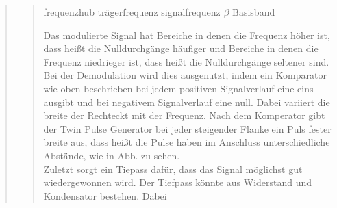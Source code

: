 \begin{quote}
\begin{quote}
        frequenzhub
        trägerfrequenz
        signalfrequenz
        $\beta$
        Basisband
        
        Das modulierte Signal hat Bereiche in denen die Frequenz höher ist, dass
        heißt die Nulldurchgänge häufiger und Bereiche in denen die Frequenz
        niedrieger ist, dass heißt die Nulldurchgänge seltener sind. Bei der
        Demodulation wird dies ausgenutzt, indem ein Komparator wie oben
        beschrieben bei jedem positiven Signalverlauf eine  eins ausgibt und bei
        negativem Signalverlauf eine null. Dabei variiert die breite der
        Rechteckt mit der Frequenz. Nach dem Komperator gibt der Twin Pulse
        Generator bei jeder steigender Flanke ein Puls fester breite aus, dass
        heißt die Pulse haben im Anschluss unterschiedliche Abstände, wie in
        Abb. zu sehen.\\
        Zuletzt sorgt ein Tiepass dafür, dass das Signal möglichst gut
        wiedergewonnen wird. Der Tiefpass könnte aus Widerstand und Kondensator
        bestehen. Dabei 
        
    \end{quote}
    
\end{quote}



%     
%         

% 
% 
% 



